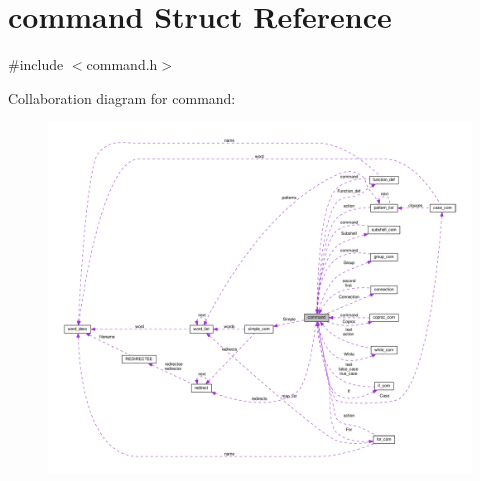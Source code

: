 \hypertarget{structcommand}{}\section{command Struct Reference}
\label{structcommand}


{\ttfamily \#include $<$command.\+h$>$}



Collaboration diagram for command\+:
\nopagebreak
\begin{figure}[H]
\begin{center}
\leavevmode
\includegraphics[width=350pt]{structcommand__coll__graph}
\end{center}
\end{figure}
